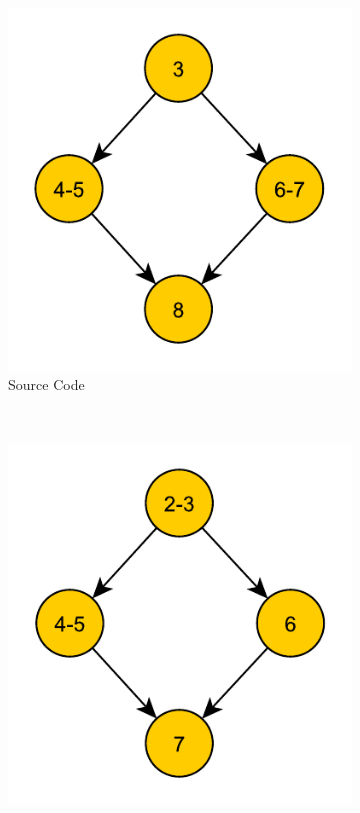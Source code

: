 \begin{figure}
\centering
\begin{subfigure}[t]{.33\textwidth}
\captionsetup{margin=10pt}
\includegraphics[width=\textwidth]{figures/CondExecSrcFlowChart.pdf}
\caption{Source Code}
\label{fig:cfgSrc}
\end{subfigure}%
~
\begin{subfigure}[t]{.33\textwidth}
\captionsetup{margin=10pt}
\includegraphics[width=\textwidth]{figures/CondExecObjUnoptFlowChart.pdf}

\end{subfigure}
\end{figure}
